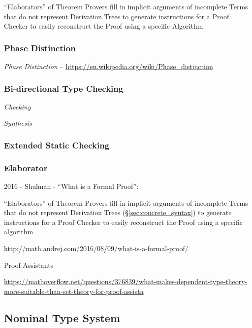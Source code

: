 ``Elaborators'' of Theorem Provers fill in implicit arguments of
incomplete Terms that do not represent Derivation Trees to generate
instructions for a Proof Checker to easily reconstruct the Proof using
a specific Algorithm



\subsubsection{Phase Distinction}\label{sec:phase_distinction}

\emph{Phase Distinction} --
\url{https://en.wikipedia.org/wiki/Phase_distinction}



\subsubsection{Bi-directional Type Checking}
\label{sec:bidirectional_checking}

\emph{Checking}

\emph{Synthesis}



\subsubsection{Extended Static Checking}\label{sec:extended_static}

\subsubsection{Elaborator}\label{sec:elaborator}

2016 - Shulman - ``What is a Formal Proof'': %

``Elaborators'' of Theorem Provers fill in implicit arguments of
incomplete Terms that do not represent Derivation Trees
(\S\ref{sec:concrete_syntax}) to generate instructions for a Proof
Checker to easily reconstruct the Proof using a specific algorithm

http://math.andrej.com/2016/08/09/what-is-a-formal-proof/ %

Proof Assistants %

\url{https://mathoverflow.net/questions/376839/what-makes-dependent-type-theory-more-suitable-than-set-theory-for-proof-assista}



\subsection{Nominal Type System}\label{sec:nominal_type_system}


